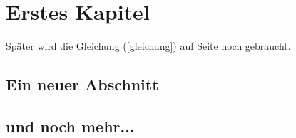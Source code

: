 \chapter{Erstes Kapitel}
Später wird die Gleichung (\ref{gleichung}) auf Seite \pageref{gleichung} noch gebraucht.
\section{Ein neuer Abschnitt}
\blindtext[5]
\section{und noch mehr...}
\blindtext[2]